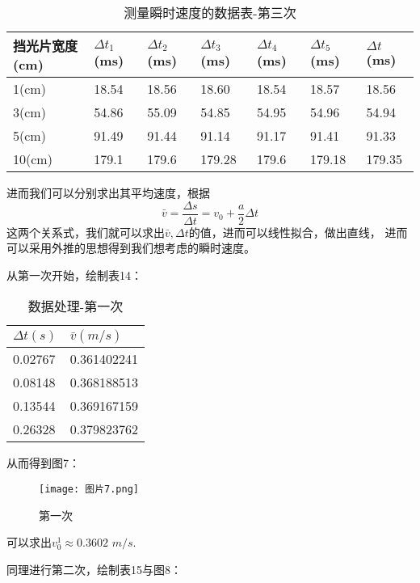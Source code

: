 \documentclass[11pt]{article}
\begin{document}
\begin{table}[!ht]
    \centering
    \begin{tabular}{|l|l|l|l|l|l|l|}
    \hline
        挡光片宽度(cm) & $\Delta t_1$(ms) & $\Delta t_2$(ms) & $\Delta t_3$(ms) & $\Delta t_4$(ms) & $\Delta t_5$(ms) & $\Delta t$(ms) \\ \hline
        1(cm)     & 18.54 & 18.56 & 18.60  & 18.54 & 18.57  & 18.56  \\ \hline
        3(cm)     & 54.86 & 55.09 & 54.85  & 54.95 & 54.96  & 54.94  \\ \hline
        5(cm)     & 91.49 & 91.44 & 91.14  & 91.17 & 91.41  & 91.33  \\ \hline
        10(cm)    & 179.1 & 179.6 & 179.28 & 179.6 & 179.18 & 179.35 \\ \hline
    \end{tabular}
    \caption{测量瞬时速度的数据表-第三次}
\end{table}

进而我们可以分别求出其平均速度，根据\begin{displaymath}\bar{v}=\frac{\Delta s}{\Delta t}=v_0+\frac{a}{2}\Delta t\end{displaymath}
这两个关系式，我们就可以求出$\bar{v},\Delta t$的值，进而可以线性拟合，做出直线，
进而可以采用外推的思想得到我们想考虑的瞬时速度。

\newpage
从第一次开始，绘制表14：

\begin{table}[!ht]
    \centering
    \begin{tabular}{|l|l|}
    \hline
        $\Delta t(s)$ & $\bar{v}(m/s)$ \\ \hline
        0.02767 & 0.361402241 \\ \hline
        0.08148 & 0.368188513 \\ \hline
        0.13544 & 0.369167159 \\ \hline
        0.26328 & 0.379823762 \\ \hline
    \end{tabular}
    \caption{数据处理-第一次}
\end{table}

从而得到图7：

\begin{figure}[htbp]
    \centering
    \texttt{[image: 图片7.png]}
    \caption{第一次}
\end{figure}

可以求出$v_{0}^1\approx 0.3602\,\, m/s$.

同理进行第二次，绘制表15与图8：
\end{document}
